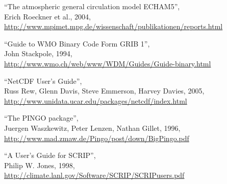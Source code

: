 \begin{thebibliography}{xx}

  ``The atmospheric general circulation model ECHAM5'', \hfill \\
  Erich Roeckner et al., 2004,  \hfill \\
  \href{http://www.mpimet.mpg.de/wissenschaft/publikationen/reports.html}
       {http://www.mpimet.mpg.de/wissenschaft/publikationen/reports.html}

  ``Guide to WMO Binary Code Form GRIB 1'', \hfill \\
  John Stackpole, 1994,  \hfill \\
  \href{http://www.wmo.ch/web/www/WDM/Guides/Guide-binary.html}
       {http://www.wmo.ch/web/www/WDM/Guides/Guide-binary.html}

  ``NetCDF User's Guide'',\hfill \\
  Russ Rew, Glenn Davis, Steve Emmerson, Harvey Davies, 2005, \hfill \\
  \href{http://www.unidata.ucar.edu/packages/netcdf/index.html}
       {http://www.unidata.ucar.edu/packages/netcdf/index.html}

  ``The PINGO package'', \hfill \\
  Juergen Waszkewitz, Peter Lenzen, Nathan Gillet, 1996,  \hfill \\
  \href{http://www.mad.zmaw.de/Pingo/post/down/BigPingo.pdf}
       {http://www.mad.zmaw.de/Pingo/post/down/BigPingo.pdf}

  ``A User's Guide for SCRIP'', \hfill \\
  Philip W. Jones, 1998,  \hfill \\
  \href{http://climate.lanl.gov/Software/SCRIP/SCRIPusers.pdf}
       {http://climate.lanl.gov/Software/SCRIP/SCRIPusers.pdf}

\end{thebibliography}
